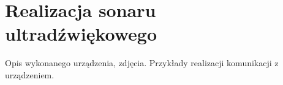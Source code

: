 \chapter[Realizacja sonaru ultradźwiękowego]{Realizacja sonaru ultradźwiękowego}

\label{realizacja}

Opis wykonanego urządzenia, zdjęcia.
Przykłady realizacji komunikacji z urządzeniem.
